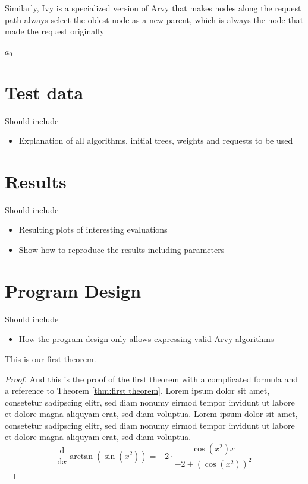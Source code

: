 \documentclass[a4paper, oneside]{discothesis}
\begin{document}
Similarly, Ivy is a specialized version of Arvy that makes nodes along the request path always select the oldest node as a new parent, which is always the node that made the request originally
\begin{algorithmic}
\State\Return $a_0$
\EndFunction
\end{algorithmic}

\chapter{Test data}

Should include
\begin{itemize}
\item Explanation of all algorithms, initial trees, weights and requests to be used
\end{itemize}

\chapter{Results}

Should include
\begin{itemize}
\item Resulting plots of interesting evaluations
\item Show how to reproduce the results including parameters
\end{itemize}

\chapter{Program Design}

Should include
\begin{itemize}
\item How the program design only allows expressing valid Arvy algorithms
\end{itemize}


\begin{theorem}\label{thm:first theorem}
	This is our first theorem.
\end{theorem}

\begin{proof}
	And this is the proof of the first theorem with a complicated formula and a reference to Theorem \ref{thm:first theorem}. Lorem ipsum dolor sit amet, consetetur sadipscing elitr, sed diam nonumy eirmod tempor invidunt ut labore et dolore magna aliquyam erat, sed diam voluptua. Lorem ipsum dolor sit amet, consetetur sadipscing elitr, sed diam nonumy eirmod tempor invidunt ut labore et dolore magna aliquyam erat, sed diam voluptua.
	\begin{equation}
		{\frac {\mathrm d}{\mathrm dx}}\arctan(\sin({x}^{2}))=-2 \cdot {\frac {\cos({x}^{2})x}{-2+\left (\cos({x}^{2})\right )^{2}}}
	\end{equation}	
\end{proof}
\end{document}
